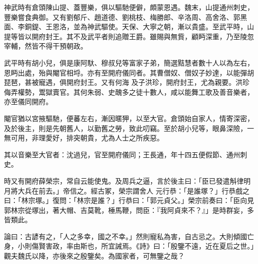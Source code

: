 \begin{pinyinscope}
 神武時有倉頭陳山提、蓋豐樂，俱以驅馳便僻，頗蒙恩遇。魏末，山提通州刺史，豐樂嘗食典御。又有劉郁斤、趙道德、劉桃枝、梅勝郎、辛洛周、高舍洛、郭黑面、李銅鍉、王恩洛，並為神武驅使。天保、大寧之朝，漸以貴盛。至武平時，山提等皆以開府封王。其不及武平者則追贈王爵。雖賜與無貲，顧眄深重，乃至陵忽宰輔，然皆不得干預朝政。



 武平時有胡小兒，俱是康阿馱、穆叔兒等富家子弟，簡選黠慧者數十人以為左右，恩眄出處，殆與閹官相埒。亦有至開府儀同者。其曹僧奴、僧奴子妙達，以能彈胡琵琶，甚被寵遇，俱開府封王。又有何海
 及子洪珍，開府封王，尤為親要。洪珍侮弄權勢，鬻獄賣官。其何朱弱、史醜多之徒十數人，咸以能舞工歌及善音樂者，亦至儀同開府。



 閹官猶以宮掖驅馳，便蕃左右，漸因暱狎，以至大官。倉頭始自家人，情寄深密，及於後主，則是先朝舊人，以勤舊之勞，致此叨竊。至於胡小兒等，眼鼻深險，一無可用，非理愛好，排突朝貴，尤為人士之所疾惡。



 其以音樂至大官者：沈過兒，官至開府儀同；王長通，年十四五便假節、通州刺史。



 時又有開府薛榮宗，常自云能使鬼。及周兵之逼，言於後主曰：「臣已發遣斛律明月將大兵在前去。」帝信之。經古冢，榮宗謂舍人
 元行恭：「是誰塚？」行恭戲之曰：「林宗塚。」復問：「林宗是誰？」行恭曰：「郭元貞父。」榮宗前奏曰：「臣向見郭林宗從塚出，著大帽、吉莫靴，棰馬鞭，問臣：『我阿貞來不？』」是時群妄，多皆類此。



 論曰：古諺有之，「人之多幸，國之不幸。」然則寵私為害，自古忌之。大則傾國亡身，小則傷賢害政，率由斯也，所宜誡焉。《詩》曰：「殷鑒不遠，近在夏后之世。」觀夫魏氏以降，亦後來之殷鑒矣。為國家者，可無鑒之哉？



\end{pinyinscope}